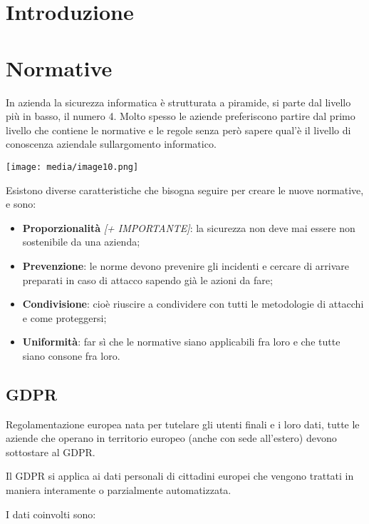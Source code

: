 \section{Introduzione}\label{introduzione}

\section{Normative}\label{normative}

In azienda la sicurezza informatica è strutturata a piramide, si parte
dal livello più in basso, il numero 4. Molto spesso le aziende
preferiscono partire dal primo livello che contiene le normative e le
regole senza però sapere qual'è il livello di conoscenza aziendale
sull\textquotesingle argomento informatico.

\texttt{[image: media/image10.png]}

Esistono diverse caratteristiche che bisogna seguire per creare le nuove
normative, e sono:

\begin{itemize}
\item
  \textbf{Proporzionalità} \emph{{[}+ IMPORTANTE{]}}: la sicurezza non
  deve mai essere non sostenibile da una azienda;
\item
  \textbf{Prevenzione}: le norme devono prevenire gli incidenti e
  cercare di arrivare preparati in caso di attacco sapendo già le azioni
  da fare;
\item
  \textbf{Condivisione}: cioè riuscire a condividere con tutti le
  metodologie di attacchi e come proteggersi;
\item
  \textbf{Uniformità}: far sì che le normative siano applicabili fra
  loro e che tutte siano consone fra loro.
\end{itemize}

\subsection{GDPR}\label{gdpr}

Regolamentazione europea nata per tutelare gli utenti finali e i loro
dati, tutte le aziende che operano in territorio europeo (anche con sede
all'estero) devono sottostare al GDPR.

Il GDPR si applica ai dati personali di cittadini europei che vengono
trattati in maniera interamente o parzialmente automatizzata.

I dati coinvolti sono:

